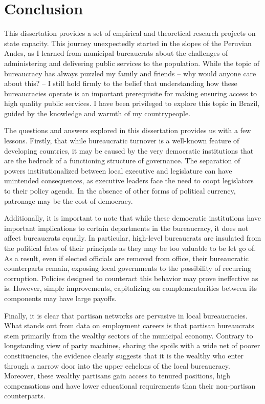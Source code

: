 \section*{Conclusion}

This dissertation provides a set of empirical and theoretical research projects on state capacity. This journey unexpectedly started in the slopes of the Peruvian Andes, as I learned from municipal bureaucrats about the challenges of administering and delivering public services to the population. While the topic of bureaucracy has always puzzled my family and friends -- why would anyone care about this? -- I still hold firmly to the belief that understanding how these bureaucracies operate is an important prerequisite for making ensuring access to high quality public services. I have been privileged to explore this topic in Brazil, guided by the knowledge and warmth of my countrypeople.

The questions and answers explored in this dissertation provides us with a few lessons. Firstly, that while bureaucratic turnover is a well-known feature of developing countries, it may be caused by the very democratic institutions that are the bedrock of a functioning structure of governance. The separation of powers institutionalized between local executive and legislature can have unintended consequences, as executive leaders face the need to coopt legislators to their policy agenda. In the absence of other forms of political currency, patronage may be the cost of democracy.

Additionally, it is important to note that while these democratic institutions have important implications to certain departments in the bureaucracy, it does not affect bureaucrats equally. In particular, high-level bureaucrats are insulated from the political fates of their principals as they may be too valuable to be let go of. As a result, even if elected officials are removed from office, their bureaucratic counterparts remain, exposing local governments to the possibility of recurring corruption. Policies designed to counteract this behavior may prove ineffective as is. However, simple improvements, capitalizing on complementarities between its components may have large payoffs.

Finally, it is clear that partisan networks are pervasive in local bureaucracies. What stands out from data on employment careers is that partisan bureaucrats stem primarily from the wealthy sectors of the municipal economy. Contrary to longstanding view of party machines, sharing the spoils with a wide net of poorer constituencies, the evidence clearly suggests that it is the wealthy who enter through a narrow door into the upper echelons of the local bureaucracy. Moreover, these wealthy partisans gain access to tenured positions, high compensations and have lower educational requirements than their non-partisan counterparts.

